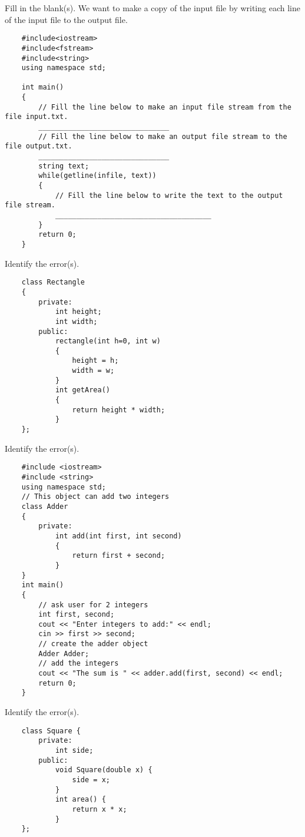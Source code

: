 \begin{problem}
Fill in the blank(s). We want to make a copy of the input file by writing each line of the input file to the output file.
\begin{verbatim}
    #include<iostream>
    #include<fstream>
    #include<string>
    using namespace std;
    
    int main() 
    {
        // Fill the line below to make an input file stream from the file input.txt.
        _______________________________
        // Fill the line below to make an output file stream to the file output.txt.
        _______________________________
        string text;  
        while(getline(infile, text))
        {
            // Fill the line below to write the text to the output file stream.
            _____________________________________
        }
        return 0;
    }
    \end{verbatim}
\end{problem}

\begin{problem}
    Identify the error(s).
    \begin{verbatim}
    class Rectangle
    {
        private:
            int height;
            int width;
        public:
            rectangle(int h=0, int w)
            {
                height = h;
                width = w;
            }
            int getArea()
            {
                return height * width;
            }
    };
    \end{verbatim}
\end{problem}

\begin{problem}
    Identify the error(s).
    \begin{verbatim}
    #include <iostream>
    #include <string>
    using namespace std;
    // This object can add two integers
    class Adder
    {
        private:
            int add(int first, int second)
            {
                return first + second;
            }
    }
    int main()
    {
        // ask user for 2 integers
        int first, second;
        cout << "Enter integers to add:" << endl;
        cin >> first >> second;
        // create the adder object
        Adder Adder;
        // add the integers
        cout << "The sum is " << adder.add(first, second) << endl;
        return 0;
    }
    \end{verbatim}
\end{problem}

\begin{problem}
    Identify the error(s).
    \begin{verbatim}
    class Square {
        private:
            int side;
        public:
            void Square(double x) {
                side = x;
            }
            int area() {
                return x * x;
            }
    };
    \end{verbatim}
\end{problem}

